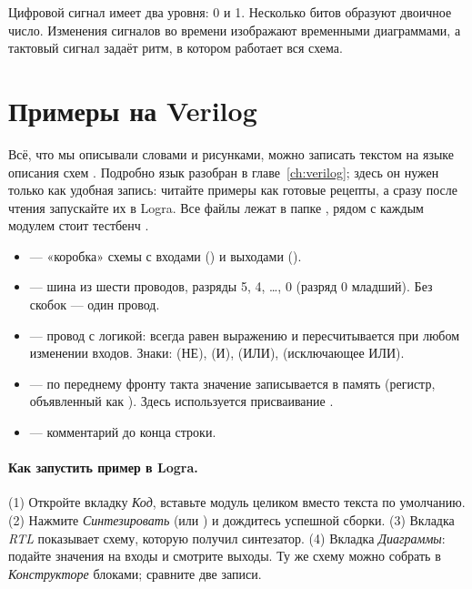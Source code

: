 \begin{ideabox}
Цифровой сигнал имеет два уровня: 0 и 1. Несколько битов образуют двоичное
число. Изменения сигналов во времени изображают временными диаграммами, а
тактовый сигнал задаёт ритм, в котором работает вся схема.
\end{ideabox}

\section{Примеры на Verilog}
\label{sec:signals-verilog}

Всё, что мы описывали словами и рисунками, можно записать текстом на языке
описания схем . Подробно язык разобран в главе~\ref{ch:verilog};
здесь он нужен только как удобная запись: читайте примеры как готовые рецепты, а
сразу после чтения запускайте их в Logra. Все файлы лежат в папке
, рядом с каждым модулем стоит тестбенч .

\begin{infobox}
\begin{itemize}
  \item {} --- «коробка» схемы с входами
    () и выходами ().
  \item \code{[5:0]} --- шина из шести проводов, разряды 5, 4, \ldots, 0
    (разряд 0 младший). Без скобок --- один провод.
  \item {} --- провод с логикой:  всегда равен
    выражению и пересчитывается при любом изменении входов. Знаки:
    \code{\textasciitilde} (НЕ), \code{\&} (И), \code{|} (ИЛИ), \code{\^{}} (исключающее ИЛИ).
  \item {} --- по переднему фронту такта
    значение  записывается в память  (регистр, объявленный как
    ). Здесь используется присваивание \code{<=}.
  \item \code{//} --- комментарий до конца строки.
\end{itemize}
\end{infobox}

\paragraph{Как запустить пример в Logra.} (1) Откройте вкладку \emph{Код},
вставьте модуль целиком вместо текста по умолчанию. (2) Нажмите
\emph{Синтезировать} (или ) и дождитесь успешной сборки.
(3) Вкладка \emph{RTL} показывает схему, которую получил синтезатор. (4) Вкладка
\emph{Диаграммы}: подайте значения на входы и смотрите выходы. Ту же схему можно
собрать в \emph{Конструкторе} блоками; сравните две записи.

